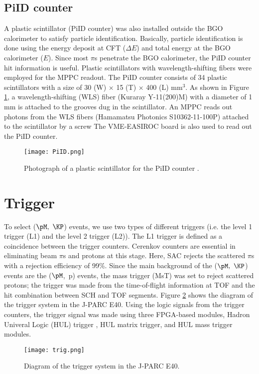\subsection{PiID counter}
A plastic scintillator (PiID counter) was also installed outside the BGO calorimeter to satisfy particle identification. Basically, particle identification is done using the energy deposit at CFT ($\Delta E$) and total energy at the BGO calorimeter ($E$). Since most $\pi$s penetrate the BGO calorimeter, the PiID counter hit information is useful. Plastic scintillators with wavelength-shifting fibers were employed for the MPPC readout. The PiID counter consists of 34 plastic scintillators with a size of 30 (W) $\times$ 15 (T) $\times$ 400 (L) mm$^{3}$. As shown in Figure \ref{fig-PiID}, a wavelength-shifting (WLS) fiber (Kuraray Y-11(200)M) with a diameter of 1 mm is attached to the grooves dug in the scintillator. An MPPC reads out photons from the WLS fibers (Hamamatsu Photonics S10362-11-100P) attached to the scintillator by a screw The VME-EASIROC board is also used to read out the PiID counter.
\begin{figure}[!h]
 \begin{center}
   \texttt{[image: PiID.png]}
   \caption{Photograph of a plastic scintillator for the PiID counter \cite{Aka-2020}.}
   \label{fig-PiID}
 \end{center}
\end{figure}

\section{Trigger}
To select ($\pM,\ \KP$) events, we use two types of different triggers (i.e. the level 1 trigger (L1) and the level 2 trigger (L2)). The L1 trigger is defined as a coincidence between the trigger counters. Cerenkov counters are essential in eliminating beam $\pi$s and protons at this stage. Here, SAC rejects the scattered $\pi$s with a rejection efficiency of 99\%. Since the main background of the ($\pM,\ \KP$) events are the ($\pM$,\ p) events, the mass trigger (MsT) was set to reject scattered protons; the trigger was made from the time-of-flight information at TOF and the hit combination between SCH and TOF segments. Figure \ref{fig-trig} shows the diagram of the trigger system in the J-PARC E40. Using the logic signals from the trigger counters, the trigger signal was made using three FPGA-based modules, Hadron Univeral Logic (HUL) trigger \cite{Hoshino-M}, HUL matrix trigger, and HUL mass trigger modules. 
\begin{figure}[!h]
 \begin{center}
   \texttt{[image: trig.png]}
   \caption{Diagram of the trigger system in the J-PARC E40.}
   \label{fig-trig}
 \end{center}
\end{figure}

